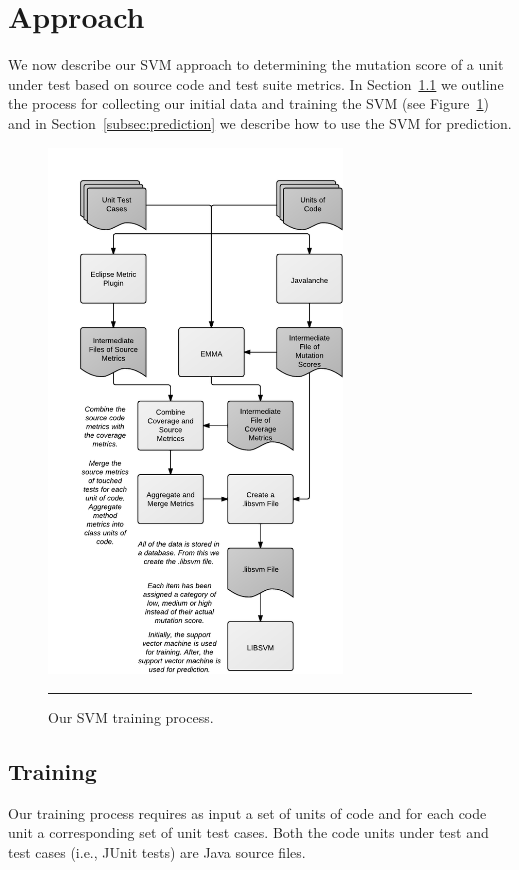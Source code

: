 \documentclass[conference]{IEEEtran}
\begin{document}
\section{Approach}
\label{sec:approach}
We now describe our SVM approach to determining the mutation score of a unit under test based on source code and test suite metrics. In Section~\ref{subsec:training} we outline the process for collecting our initial data and training the SVM (see Figure~\ref{fig:process}) and in Section~\ref{subsec:prediction} we describe how to use the SVM for prediction.

\begin{figure}[!t]
  \centering
  \includegraphics[width=7.8cm]{figures/process.pdf}
  \caption{Our SVM training process.}
  \label{fig:process}
  \vspace{2mm}
  \hrule
\end{figure}


\subsection{Training}
\label{subsec:training}
Our training process requires as input a set of units of code and for each code unit a corresponding set of unit test cases. Both the code units under test and test cases (i.e., JUnit tests) are Java source files.
\end{document}
